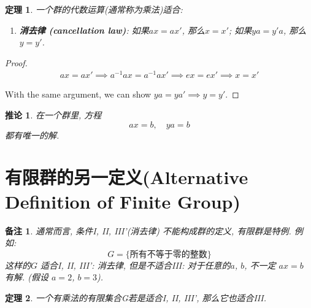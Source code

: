 \documentclass[utf8]{ctexbook}
\newtheorem{theorem}{定理}[section]
\newtheorem{memo}{备注}[section]
\newtheorem{corollary}{推论}[section]
\begin{document}
\begin{theorem}
一个群的代数运算(通常称为乘法)适合:
\begin{enumerate}
\item[III']{\textbf{消去律 (cancellation law)}: 如果$ax = a x'$, 那么$x = x'$; 如果$ya = y' a $, 那么$y = y'$.}
\end{enumerate}
\end{theorem}

\begin{proof}
\begin{align*}
ax = a x' \implies a^{-1}a x = a^{-1} a x' \implies e x = e x' \implies x = x'
\end{align*}

With the same argument, we can show $ya = ya' \implies y = y'$.

\end{proof}


\begin{corollary}
在一个群里, 方程
\begin{equation}
ax = b, \quad y a = b
\end{equation}
都有唯一的解.
\end{corollary}

\section{有限群的另一定义(Alternative Definition of Finite Group)}

\begin{memo}
通常而言, 条件I, II, III'(消去律) 不能构成群的定义, 有限群是特例. 例如: 
\begin{equation}
G = \{ \mbox{所有不等于零的整数} \}
\end{equation}
这样的$G$ 适合I, II, III': 消去律, 但是不适合III: 对于任意的$a$, $b$, 不一定 $ax=b$ 有解. (假设 $a=2$, $b=3$).

\end{memo}

\begin{theorem}
一个有乘法的有限集合G若是适合I, II, III', 那么它也适合III.
\end{theorem}
\end{document}
